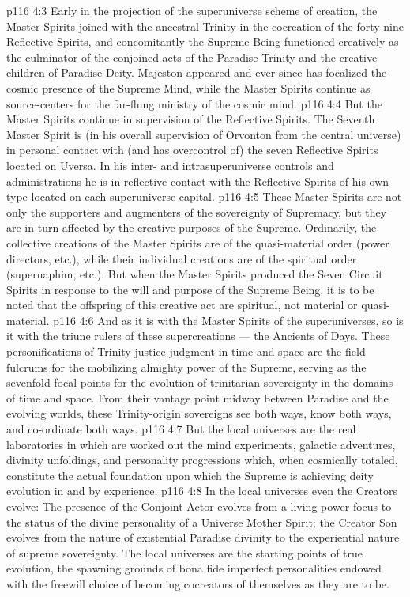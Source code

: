 \vs p116 4:3 Early in the projection of the superuniverse scheme of creation, the Master Spirits joined with the ancestral Trinity in the cocreation of the forty\hyp{}nine Reflective Spirits, and concomitantly the Supreme Being functioned creatively as the culminator of the conjoined acts of the Paradise Trinity and the creative children of Paradise Deity. Majeston appeared and ever since has focalized the cosmic presence of the Supreme Mind, while the Master Spirits continue as source\hyp{}centers for the far\hyp{}flung ministry of the cosmic mind.
\vs p116 4:4 But the Master Spirits continue in supervision of the Reflective Spirits. The Seventh Master Spirit is (in his overall supervision of Orvonton from the central universe) in personal contact with (and has overcontrol of) the seven Reflective Spirits located on Uversa. In his inter\hyp{} and intrasuperuniverse controls and administrations he is in reflective contact with the Reflective Spirits of his own type located on each superuniverse capital.
\vs p116 4:5 These Master Spirits are not only the supporters and augmenters of the sovereignty of Supremacy, but they are in turn affected by the creative purposes of the Supreme. Ordinarily, the collective creations of the Master Spirits are of the quasi\hyp{}material order (power directors, etc.), while their individual creations are of the spiritual order (supernaphim, etc.). But when the Master Spirits  produced the Seven Circuit Spirits in response to the will and purpose of the Supreme Being, it is to be noted that the offspring of this creative act are spiritual, not material or quasi\hyp{}material.
\vs p116 4:6 \pc And as it is with the Master Spirits of the superuniverses, so is it with the triune rulers of these supercreations --- the Ancients of Days. These personifications of Trinity justice\hyp{}judgment in time and space are the field fulcrums for the mobilizing almighty power of the Supreme, serving as the sevenfold focal points for the evolution of trinitarian sovereignty in the domains of time and space. From their vantage point midway between Paradise and the evolving worlds, these Trinity\hyp{}origin sovereigns see both ways, know both ways, and co\hyp{}ordinate both ways.
\vs p116 4:7 \pc But the local universes are the real laboratories in which are worked out the mind experiments, galactic adventures, divinity unfoldings, and personality progressions which, when cosmically totaled, constitute the actual foundation upon which the Supreme is achieving deity evolution in and by experience.
\vs p116 4:8 In the local universes even the Creators evolve: The presence of the Conjoint Actor evolves from a living power focus to the status of the divine personality of a Universe Mother Spirit; the Creator Son evolves from the nature of existential Paradise divinity to the experiential nature of supreme sovereignty. The local universes are the starting points of true evolution, the spawning grounds of bona fide imperfect personalities endowed with the freewill choice of becoming cocreators of themselves as they are to be.
